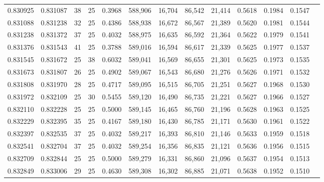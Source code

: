 \begin{tabular}{rrrrrrrrrrrrr}
0.830925 & 0.831087 &    38 &  25 &                                     0.3968 & 588,906 &  16,704 &  86,542 &  21,414 & 0.5618 & 0.1984 & 0.1547 \\
0.831088 & 0.831238 &    32 &  25 &                                     0.4386 & 588,938 &  16,672 &  86,567 &  21,389 & 0.5620 & 0.1981 & 0.1544 \\
0.831238 & 0.831372 &    37 &  25 &                                     0.4032 & 588,975 &  16,635 &  86,592 &  21,364 & 0.5622 & 0.1979 & 0.1541 \\
0.831376 & 0.831543 &    41 &  25 &                                     0.3788 & 589,016 &  16,594 &  86,617 &  21,339 & 0.5625 & 0.1977 & 0.1537 \\
0.831545 & 0.831672 &    25 &  38 &                                     0.6032 & 589,041 &  16,569 &  86,655 &  21,301 & 0.5625 & 0.1973 & 0.1535 \\
0.831673 & 0.831807 &    26 &  25 &                                     0.4902 & 589,067 &  16,543 &  86,680 &  21,276 & 0.5626 & 0.1971 & 0.1532 \\
0.831808 & 0.831970 &    28 &  25 &                                     0.4717 & 589,095 &  16,515 &  86,705 &  21,251 & 0.5627 & 0.1968 & 0.1530 \\
0.831972 & 0.832109 &    25 &  30 &                                     0.5455 & 589,120 &  16,490 &  86,735 &  21,221 & 0.5627 & 0.1966 & 0.1527 \\
0.832110 & 0.832228 &    25 &  25 &                                     0.5000 & 589,145 &  16,465 &  86,760 &  21,196 & 0.5628 & 0.1963 & 0.1525 \\
0.832229 & 0.832395 &    35 &  25 &                                     0.4167 & 589,180 &  16,430 &  86,785 &  21,171 & 0.5630 & 0.1961 & 0.1522 \\
0.832397 & 0.832535 &    37 &  25 &                                     0.4032 & 589,217 &  16,393 &  86,810 &  21,146 & 0.5633 & 0.1959 & 0.1518 \\
0.832541 & 0.832704 &    37 &  25 &                                     0.4032 & 589,254 &  16,356 &  86,835 &  21,121 & 0.5636 & 0.1956 & 0.1515 \\
0.832709 & 0.832844 &    25 &  25 &                                     0.5000 & 589,279 &  16,331 &  86,860 &  21,096 & 0.5637 & 0.1954 & 0.1513 \\
0.832849 & 0.833006 &    29 &  25 &                                     0.4630 & 589,308 &  16,302 &  86,885 &  21,071 & 0.5638 & 0.1952 & 0.1510 \\

\end{tabular}
